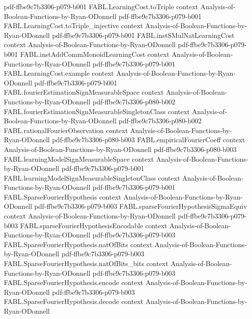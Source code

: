 \begin{theorem}
  {pdf-ffbe9c7b3306-p079-b001}
\proofstep
  {FABL.LearningCost.toTriple}
  {context}
  {Analysis-of-Boolean-Functions-by-Ryan-ODonnell}
  {pdf-ffbe9c7b3306-p079-b001}
\proofstep
  {FABL.LearningCost.toTriple_injective}
  {context}
  {Analysis-of-Boolean-Functions-by-Ryan-ODonnell}
  {pdf-ffbe9c7b3306-p079-b001}
\proofstep
  {FABL.instSMulNatLearningCost}
  {context}
  {Analysis-of-Boolean-Functions-by-Ryan-ODonnell}
  {pdf-ffbe9c7b3306-p079-b001}
\proofstep
  {FABL.instAddCommMonoidLearningCost}
  {context}
  {Analysis-of-Boolean-Functions-by-Ryan-ODonnell}
  {pdf-ffbe9c7b3306-p079-b001}
\proofstep
  {FABL.LearningCost.example}
  {context}
  {Analysis-of-Boolean-Functions-by-Ryan-ODonnell}
  {pdf-ffbe9c7b3306-p079-b001}
\proofstep
  {FABL.fourierEstimationSignMeasurableSpace}
  {context}
  {Analysis-of-Boolean-Functions-by-Ryan-ODonnell}
  {pdf-ffbe9c7b3306-p080-b002}
\proofstep
  {FABL.fourierEstimationSignMeasurableSingletonClass}
  {context}
  {Analysis-of-Boolean-Functions-by-Ryan-ODonnell}
  {pdf-ffbe9c7b3306-p080-b002}
\proofstep
  {FABL.rationalFourierObservation}
  {context}
  {Analysis-of-Boolean-Functions-by-Ryan-ODonnell}
  {pdf-ffbe9c7b3306-p080-b003}
\proofstep
  {FABL.empiricalFourierCoeff}
  {context}
  {Analysis-of-Boolean-Functions-by-Ryan-ODonnell}
  {pdf-ffbe9c7b3306-p080-b003}
\proofstep
  {FABL.learningModelSignMeasurableSpace}
  {context}
  {Analysis-of-Boolean-Functions-by-Ryan-ODonnell}
  {pdf-ffbe9c7b3306-p079-b001}
\proofstep
  {FABL.learningModelSignMeasurableSingletonClass}
  {context}
  {Analysis-of-Boolean-Functions-by-Ryan-ODonnell}
  {pdf-ffbe9c7b3306-p079-b001}
\proofstep
  {FABL.SparseFourierHypothesis}
  {context}
  {Analysis-of-Boolean-Functions-by-Ryan-ODonnell}
  {pdf-ffbe9c7b3306-p079-b003}
\proofstep
  {FABL.sparseFourierHypothesisSigmaEquiv}
  {context}
  {Analysis-of-Boolean-Functions-by-Ryan-ODonnell}
  {pdf-ffbe9c7b3306-p079-b003}
\proofstep
  {FABL.sparseFourierHypothesisEncodable}
  {context}
  {Analysis-of-Boolean-Functions-by-Ryan-ODonnell}
  {pdf-ffbe9c7b3306-p079-b003}
\proofstep
  {FABL.SparseFourierHypothesis.natOfBits}
  {context}
  {Analysis-of-Boolean-Functions-by-Ryan-ODonnell}
  {pdf-ffbe9c7b3306-p079-b003}
\proofstep
  {FABL.SparseFourierHypothesis.natOfBits_bits}
  {context}
  {Analysis-of-Boolean-Functions-by-Ryan-ODonnell}
  {pdf-ffbe9c7b3306-p079-b003}
\proofstep
  {FABL.SparseFourierHypothesis.encode}
  {context}
  {Analysis-of-Boolean-Functions-by-Ryan-ODonnell}
  {pdf-ffbe9c7b3306-p079-b003}
\proofstep
  {FABL.SparseFourierHypothesis.decode}
  {context}
  {Analysis-of-Boolean-Functions-by-Ryan-ODonnell}

\end{theorem}

